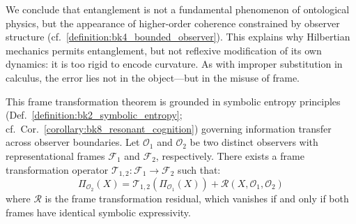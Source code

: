 \begin{scholium}
\label{scholium:bk8_on_frame_fidelity}
We conclude that entanglement is not a fundamental phenomenon of ontological physics, but the appearance of higher-order coherence constrained by observer structure (cf.~\ref{definition:bk4_bounded_observer}). This explains why Hilbertian mechanics permits entanglement, but not reflexive modification of its own dynamics: it is too rigid to encode curvature. As with improper substitution in calculus, the error lies not in the object—but in the misuse of frame.
\end{scholium}
\begin{theorem}
\label{theorem:bk8_holographic_surface_entropy}
This frame transformation theorem is grounded in symbolic entropy principles (Def.~\ref{definition:bk2_symbolic_entropy}; cf.~Cor.~\ref{corollary:bk8_resonant_cognition}) governing information transfer across observer boundaries.
Let $\mathcal{O}_1$ and $\mathcal{O}_2$ be two distinct observers with representational frames $\mathcal{F}_1$ and $\mathcal{F}_2$, respectively. There exists a frame transformation operator $\mathcal{T}_{1,2}: \mathcal{F}_1 \to \mathcal{F}_2$ such that:
\[
\Pi_{\mathcal{O}_2}(X) = \mathcal{T}_{1,2}(\Pi_{\mathcal{O}_1}(X)) + \mathcal{R}(X, \mathcal{O}_1, \mathcal{O}_2)
\]
where $\mathcal{R}$ is the frame transformation residual, which vanishes if and only if both frames have identical symbolic expressivity.
\end{theorem}
